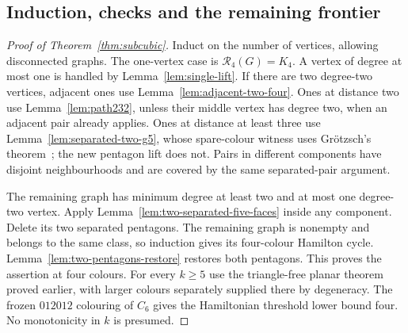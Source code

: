 \documentclass[11pt]{article}
\theoremstyle{remark}
\newcommand{\R}{\mathcal R}
\numberwithin{equation}{section}
\begin{document}
\subsection{Induction, checks and the remaining frontier}
\begin{proof}[Proof of Theorem~\ref{thm:subcubic}]
Induct on the number of vertices, allowing disconnected graphs.
The one-vertex case is $\R_4(G)=K_4$. A vertex of degree at most one
is handled by Lemma~\ref{lem:single-lift}.
If there are two degree-two vertices, adjacent ones use Lemma~\ref{lem:adjacent-two-four}. Ones at distance two use Lemma~\ref{lem:path232}, unless their
middle vertex has degree two, when an adjacent pair already applies.
Ones at distance at least three use Lemma~\ref{lem:separated-two-g5}, whose spare-colour witness uses
Gr\"otzsch's theorem~\cite{Grotzsch59}; the new pentagon lift does not.
Pairs in different components have disjoint neighbourhoods and
are covered by the same separated-pair argument.

The remaining graph has minimum degree at least two and at most
one degree-two vertex. Apply Lemma~\ref{lem:two-separated-five-faces}
inside any component. Delete its two separated pentagons.
The remaining graph is nonempty and belongs to the same class, so
induction gives its four-colour Hamilton cycle.
Lemma~\ref{lem:two-pentagons-restore} restores both pentagons.
This proves the assertion at four colours.
For every $k\ge5$ use the triangle-free planar theorem proved earlier,
with larger colours separately supplied there by degeneracy.
The frozen $012012$ colouring of $C_6$ gives the Hamiltonian
threshold lower bound four. No monotonicity in $k$ is presumed.
\end{proof}
\end{document}
